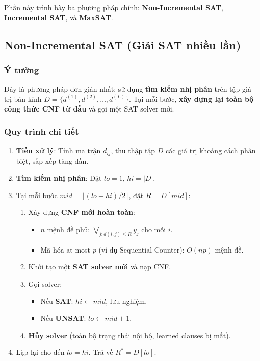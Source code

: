 \documentclass[11pt,a4paper]{article}
\begin{document}
Phần này trình bày ba phương pháp chính: \textbf{Non-Incremental SAT}, \textbf{Incremental SAT}, và \textbf{MaxSAT}.


\subsection{Non-Incremental SAT (Giải SAT nhiều lần)}
\label{sec:non-incremental}

\subsubsection{Ý tưởng}

Đây là phương pháp đơn giản nhất: sử dụng \textbf{tìm kiếm nhị phân} trên tập giá trị bán kính $D = \{d^{(1)}, d^{(2)}, \dots, d^{(L)}\}$.
Tại mỗi bước, \textbf{xây dựng lại toàn bộ công thức CNF từ đầu} và gọi một SAT solver mới.

\subsubsection{Quy trình chi tiết}

\begin{enumerate}[nosep]
    \item \textbf{Tiền xử lý}: Tính ma trận $d_{ij}$, thu thập tập $D$ các giá trị khoảng cách phân biệt, sắp xếp tăng dần.
    \item \textbf{Tìm kiếm nhị phân}: Đặt $lo = 1$, $hi = |D|$.
    \item  Tại mỗi bước $mid = \lfloor(lo + hi)/2\rfloor$, đặt $R = D[mid]$:
    \begin{enumerate}[nosep, label=(\alph*)]
        \item Xây dựng \textbf{CNF mới hoàn toàn}:
            \begin{itemize}[nosep]
                \item $n$ mệnh đề phủ: $\bigvee_{j: d(i,j) \le R} y_j$ cho mỗi $i$.
                \item Mã hóa at-most-$p$ (ví dụ Sequential Counter): $O(np)$ mệnh đề.
            \end{itemize}
        \item Khởi tạo một \textbf{SAT solver mới} và nạp CNF.
        \item Gọi solver:
            \begin{itemize}[nosep]
                \item Nếu \textbf{SAT}: $hi \gets mid$, lưu nghiệm.
                \item Nếu \textbf{UNSAT}: $lo \gets mid + 1$.
            \end{itemize}
        \item \textbf{Hủy solver} (toàn bộ trạng thái nội bộ, learned clauses bị mất).
    \end{enumerate}
    \item Lặp lại cho đến $lo = hi$. Trả về $R^* = D[lo]$.
\end{enumerate}
\end{document}
